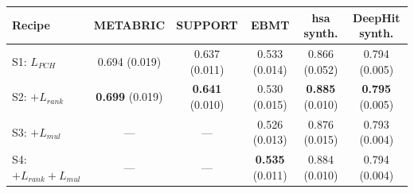 \begin{tabular}{lccccc}
\toprule
Recipe & METABRIC & SUPPORT & EBMT & hsa synth. & DeepHit synth. \\
\midrule
S1: $L_{PCH}$ & 0.694 (0.019) & 0.637 (0.011) & 0.533 (0.014) & 0.866 (0.052) & 0.794 (0.005) \\
S2: $+L_{rank}$ & \textbf{0.699} (0.019) & \textbf{0.641} (0.010) & 0.530 (0.015) & \textbf{0.885} (0.010) & \textbf{0.795} (0.005) \\
S3: $+L_{mul}$ & --- & --- & 0.526 (0.013) & 0.876 (0.015) & 0.793 (0.004) \\
S4: $+L_{rank}+L_{mul}$ & --- & --- & \textbf{0.535} (0.011) & 0.884 (0.010) & 0.794 (0.004) \\
\bottomrule
\end{tabular}
